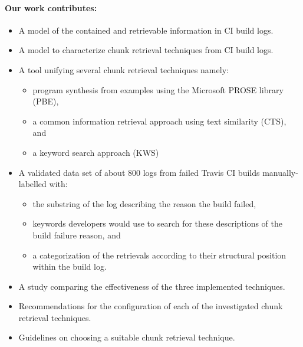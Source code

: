 \documentclass[\myrootdir/main.tex]{subfiles}
\begin{document}
\paragraph{Our work contributes:}
\begin{itemize}
  \item A model of the contained and retrievable information in CI build logs.
  \item A model to characterize chunk retrieval techniques from CI build logs.
  \item A tool unifying several chunk retrieval techniques namely:
        \begin{itemize}
          \item program synthesis from examples using the Microsoft PROSE library (PBE),
          \item a common information retrieval approach using text similarity (CTS), and
          \item a keyword search approach (KWS)
        \end{itemize}
  \item A validated data set of about 800 logs from failed Travis CI builds manually-labelled with:
        \begin{itemize}
          \item the substring of the log describing the reason the build failed,
          \item keywords developers would use to search for these descriptions of the build failure reason, and
          \item a categorization of the retrievals according to their structural position within the build log.
        \end{itemize}
  \item A study comparing the effectiveness of the three implemented techniques.
  \item Recommendations for the configuration of each of the investigated chunk retrieval techniques.
  \item Guidelines on choosing a suitable chunk retrieval technique. %
\end{itemize}
\end{document}
